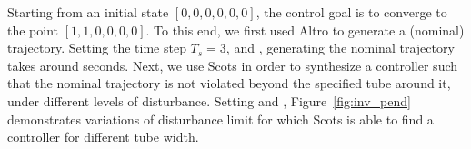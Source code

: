 Starting from an initial state $[0,0,0,0,0,0]$, the control goal is to converge to the point 
$[1,1,0,0,0,0]$. To this end, we first used Altro to generate a (nominal) trajectory. Setting the time step $T_s=3$, and , generating the nominal trajectory takes around  seconds. Next, we use Scots in order to synthesize a controller such that the nominal trajectory is not violated beyond the specified tube around it, under different levels of disturbance. Setting  and , Figure~\ref{fig:inv_pend} demonstrates variations of disturbance limit for which Scots is able to find a controller for different tube width. %





